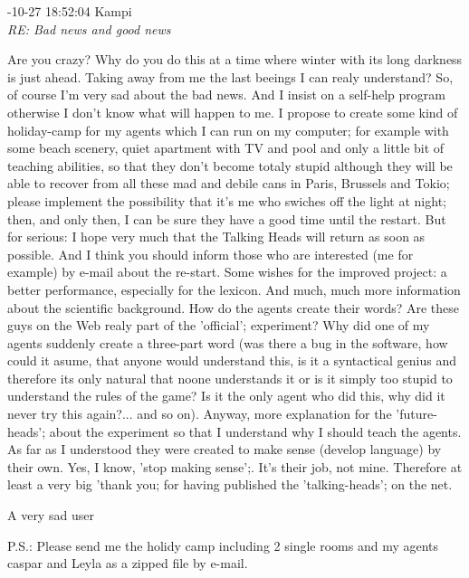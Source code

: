 \begin{mail}
{-10-27 18:52:04 Kampi}\\
{\itshape RE: Bad news and good news}

Are you crazy? Why do you do this at a time where winter with its long darkness is just ahead. Taking away 
from me the last beeings I can realy understand?
So, of course I'm very sad about the bad news. And I insist on a self-help program otherwise I don't know what will happen to me. I propose to create some kind of holiday-camp for my agents which I can run on my computer; for example with some beach scenery, quiet apartment with TV and pool and only a little bit of teaching abilities, so that they don't become totaly stupid although they will be able to recover from all these mad and debile cans in Paris, Brussels and Tokio; please implement the possibility that it's me who swiches off the light at night; then, and only then, I can be sure they have a good time until the restart.
But for serious: I hope very much that the Talking Heads will return as soon as possible. And I think you should inform those who are interested (me for example) by e-mail about the re-start.
Some wishes for the improved project: a better performance, especially for the lexicon. And much, much more information about the scientific background. How do the agents create their words? Are these guys on the Web realy part of the 'official'; experiment? Why did one of my agents suddenly create a three-part word (was there a bug in the software, how could it asume, that anyone would understand this, is it a syntactical genius and therefore its only natural that noone understands it or is it simply too stupid to understand the rules of the game? Is it the only agent who did this, why did it never try this again?... and so on). Anyway, more explanation for the 'future-heads'; about the experiment so that I understand why I should teach the agents. As far as I understood they were created to make sense (develop language) by their own.
Yes, I know, 'stop making sense';. It's their job, not mine.
Therefore at least a very big 'thank you; for having published the 'talking-heads'; on the net.

A very sad user

P.S.: Please send me the holidy camp including 2 single rooms and my agents caspar and Leyla as a zipped file by e-mail.
\end{mail}



